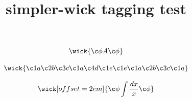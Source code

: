\documentclass{article}
\title{simpler-wick tagging test}
\begin{document}
\begin{equation}
\wick{\c\phi A \c\phi}
\end{equation}

\begin{equation}
\wick{
\c1 a \c2 b \c3 c \c1 a \c4 d \c1 e
\c1 e \c1 a \c2 b \c3 c \c1 a
}
\end{equation}

\begin{equation}
\wick[offset=2em]{\c\phi \int \frac{dx}{x} \c\phi}
\end{equation}
\end{document}
